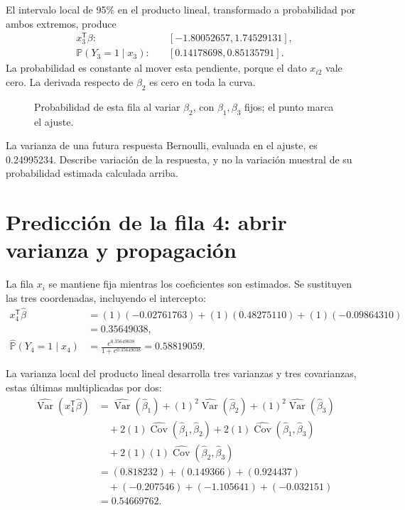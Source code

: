 \documentclass[11pt,a4paper]{article}
\newcommand{\Prob}{\mathbb P}
\newcommand{\T}{^{\mathsf T}}
\DeclareMathOperator{\Var}{Var}
\DeclareMathOperator{\Cov}{Cov}
\begin{document}
El intervalo local de 95\% en el producto lineal,
transformado a probabilidad por ambos extremos, produce
\[
\begin{aligned}
x_{3}\T\beta:&\quad[-1.80052657,1.74529131],\\\Prob(Y_{3}=1\mid x_{3}):&\quad[0.14178698,0.85135791].\end{aligned}
\]
La probabilidad es constante al mover esta pendiente, porque el dato $x_{i2}$ vale cero. La derivada respecto de $\beta_2$ es cero en toda la curva.
\begin{figure}[H]\centering
{}
\caption{Probabilidad de esta fila al variar \(\beta_2\), con \(\beta_1,\beta_3\) fijos; el punto marca el ajuste.}
\end{figure}

La varianza de una futura respuesta Bernoulli,
evaluada en el ajuste, es 0.24995234.
Describe variación de la respuesta, y no la variación
muestral de su probabilidad estimada calculada arriba.
\endgroup

\clearpage
\section{Predicción de la fila 4: abrir varianza y propagación}\label{logit113}
\begingroup\small
\setlength{\abovedisplayskip}{4pt}\setlength{\belowdisplayskip}{4pt}
La fila \(x_i\) se mantiene fija mientras los coeficientes
son estimados. Se sustituyen las tres coordenadas,
incluyendo el intercepto:
\[
\begin{aligned}
x_{4}\T\widehat\beta&=(1)(-0.02761763)+(1)(0.48275110)+(1)(-0.09864310)\\&=0.35649038,\\\widehat{\Prob}(Y_{4}=1\mid x_{4})&=\frac{e^{0.35649038}}{1+e^{0.35649038}}=0.58819059.\end{aligned}
\]

La varianza local del producto lineal desarrolla tres varianzas
y tres covarianzas, estas últimas multiplicadas por dos:
\[
\begin{aligned}
\widehat{\Var}(x_{4}\T\widehat\beta)&=\widehat{\Var}(\widehat\beta_1)+(1)^2\widehat{\Var}(\widehat\beta_2)+(1)^2\widehat{\Var}(\widehat\beta_3)\\&\quad+2(1)\widehat{\Cov}(\widehat\beta_1,\widehat\beta_2)+2(1)\widehat{\Cov}(\widehat\beta_1,\widehat\beta_3)\\&\quad+2(1)(1)\widehat{\Cov}(\widehat\beta_2,\widehat\beta_3)\\&=(0.818232)+(0.149366)+(0.924437)\\&\quad+(-0.207546)+(-1.105641)+(-0.032151)\\&=0.54669762.\end{aligned}
\]
\end{document}
